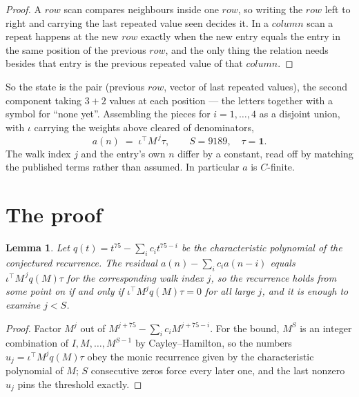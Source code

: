 \documentclass[11pt,a4paper]{article}
\theoremstyle{plain}
\newtheorem{lemma}[theorem]{Lemma}
\theoremstyle{definition}
\begin{document}
\begin{proof}
A $row$ scan compares neighbours inside one $row$, so writing the
$row$ left to right and carrying the last repeated value seen decides it. In a
$column$ scan a repeat happens at the new $row$ exactly when the new entry equals the
entry in the same position of the previous $row$, and the only thing the relation needs
besides that entry is the previous repeated value of that $column$.
\end{proof}

So the state is the pair (previous $row$, vector of last repeated values), the second
component taking $3+2$ values at each position --- the letters together with a symbol for
``none yet''. Assembling the pieces for $i=1,\dots,4$ as a disjoint union, with $\iota$ carrying the weights above cleared of denominators,
\[
a(n)\;=\;\iota^{\!\top}M^{\,j}\tau ,\qquad S=9189,\quad\tau=\mathbf{1} .
\]
The walk index $j$ and the entry's own $n$ differ by a constant, read off by matching the
published terms rather than assumed. In particular $a$ is $C$-finite.

\section{The proof}

\begin{lemma}\label{lem:crit}
Let $q(t)=t^{75}-\sum_i c_it^{75-i}$ be the characteristic polynomial of the
conjectured recurrence. The residual $a(n)-\sum_ic_ia(n-i)$ equals
$\iota^{\!\top}M^{\,j}q(M)\tau$ for the corresponding walk index $j$, so the recurrence
holds from some point on if and only if $\iota^{\!\top}M^{j}q(M)\tau=0$ for all large $j$,
and it is enough to examine $j<S$.
\end{lemma}

\begin{proof}
Factor $M^{j}$ out of $M^{j+75}-\sum_ic_iM^{j+75-i}$. For the bound, $M^{S}$
is an integer combination of $I,M,\dots,M^{S-1}$ by Cayley--Hamilton, so the numbers
$u_j=\iota^{\!\top}M^{j}q(M)\tau$ obey the monic recurrence given by the characteristic
polynomial of $M$; $S$ consecutive zeros force every later one, and the last nonzero $u_j$
pins the threshold exactly.
\end{proof}
\end{document}
